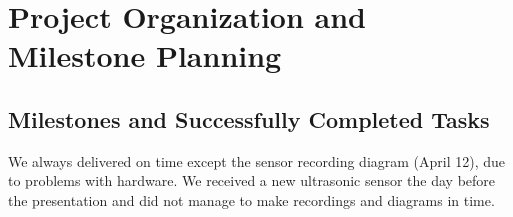 \chapter[Project Organization and Milestone Planning]
{Project Organization and\\ Milestone Planning}

\section{Milestones and Successfully Completed Tasks}
We always delivered on time except the sensor recording diagram (April 12), due
to problems with hardware. We received a new ultrasonic sensor the day before
the presentation and did not manage to make recordings and diagrams in time.
